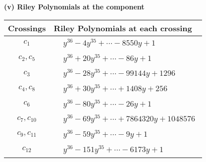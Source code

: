 \documentclass[1p]{elsarticle_modified}
\theoremstyle{definition}
\begin{document}
\newpage\renewcommand{\arraystretch}{1}
\flushleft \textbf{(v) Riley Polynomials at the component}\newline \\
\begin{tabular}{m{50pt}|m{274pt}}
Crossings & \hspace{64pt}Riley Polynomials at each crossing \\
\hline $$\begin{aligned}c_{1}\end{aligned}$$&$\begin{aligned}
&y^{36}-4 y^{35}+\cdots-8550 y+1
\end{aligned}$\\
\hline $$\begin{aligned}c_{2},c_{5}\end{aligned}$$&$\begin{aligned}
&y^{36}+20 y^{35}+\cdots-86 y+1
\end{aligned}$\\
\hline $$\begin{aligned}c_{3}\end{aligned}$$&$\begin{aligned}
&y^{36}-28 y^{35}+\cdots-99144 y+1296
\end{aligned}$\\
\hline $$\begin{aligned}c_{4},c_{8}\end{aligned}$$&$\begin{aligned}
&y^{36}+30 y^{35}+\cdots+1408 y+256
\end{aligned}$\\
\hline $$\begin{aligned}c_{6}\end{aligned}$$&$\begin{aligned}
&y^{36}-80 y^{35}+\cdots-26 y+1
\end{aligned}$\\
\hline $$\begin{aligned}c_{7},c_{10}\end{aligned}$$&$\begin{aligned}
&y^{36}-69 y^{35}+\cdots+7864320 y+1048576
\end{aligned}$\\
\hline $$\begin{aligned}c_{9},c_{11}\end{aligned}$$&$\begin{aligned}
&y^{36}-59 y^{35}+\cdots-9 y+1
\end{aligned}$\\
\hline $$\begin{aligned}c_{12}\end{aligned}$$&$\begin{aligned}
&y^{36}-151 y^{35}+\cdots-6173 y+1
\end{aligned}$\\
\hline
\end{tabular}\\~\\
\end{document}
